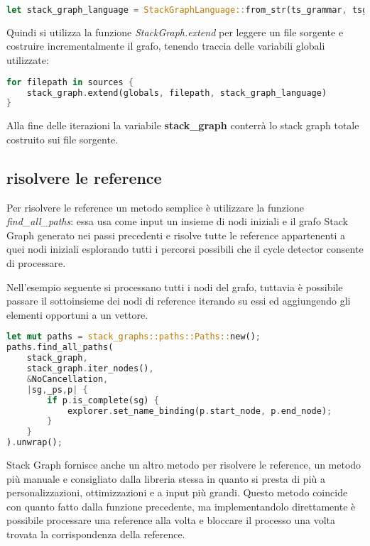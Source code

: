 \begin{lstlisting}[language=Rust]
let stack_graph_language = StackGraphLanguage::from_str(ts_grammar, tsg_grammar).unwrap();
\end{lstlisting}

Quindi si utilizza la funzione \emph{StackGraph.extend} per leggere un file sorgente e costruire incrementalmente il grafo, tenendo traccia delle variabili globali utilizzate:

\begin{lstlisting}[language=Rust]
for filepath in sources {
    stack_graph.extend(globals, filepath, stack_graph_language)
}
\end{lstlisting}

Alla fine delle iterazioni la variabile \textbf{stack\_graph} conterr\`a lo stack graph totale costruito sui file sorgente.

\subsection{risolvere le reference}

Per risolvere le reference un metodo semplice \`e utilizzare la funzione \emph{find\_all\_paths}: essa usa come input un insieme di nodi iniziali e il grafo Stack Graph generato nei passi precedenti e risolve tutte le reference appartenenti a quei nodi iniziali esplorando tutti i percorsi possibili che il cycle detector consente di processare.

Nell'esempio seguente si processano tutti i nodi del grafo, tuttavia \`e possibile passare il sottoinsieme dei nodi di reference iterando su essi ed aggiungendo gli elementi opportuni a un vettore.

\begin{lstlisting}[language=Rust]
let mut paths = stack_graphs::paths::Paths::new();
paths.find_all_paths(
    stack_graph,
    stack_graph.iter_nodes(),
    &NoCancellation,
    |sg,_ps,p| {
        if p.is_complete(sg) {
            explorer.set_name_binding(p.start_node, p.end_node);
        }
    }
).unwrap();
\end{lstlisting}

Stack Graph fornisce anche un altro metodo per risolvere le reference, un metodo pi\`u manuale e consigliato dalla libreria stessa in quanto si presta di pi\`u a personalizzazioni, ottimizzazioni e a input pi\`u grandi.
Questo metodo coincide con quanto fatto dalla funzione precedente, ma implementandolo direttamente \`e possibile processare una reference alla volta e bloccare il processo una volta trovata la corrispondenza della reference.

